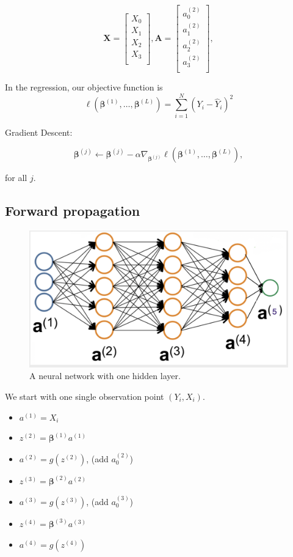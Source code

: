 \documentclass[]{book}
\providecommand{\tightlist}{%
  \setlength{\itemsep}{0pt}\setlength{\parskip}{0pt}}
\begin{document}
\[
\mathbf{X}= \begin{bmatrix}
X_0 \\ 
X_1 \\
X_2 \\ 
X_3 \\ 
\end{bmatrix},
\mathbf{A}= \begin{bmatrix}
a_0^{(2)} \\ 
a_1^{(2)} \\
a_2^{(2)} \\ 
a_3^{(2)} \\ 
\end{bmatrix},
\]

In the regression, our objective function is \[
\ell(\boldsymbol{\beta}^{(1)}, \ldots, \boldsymbol{\beta}^{(L)})= \sum_{i=1}^{N}(Y_i - \widehat{Y}_i)^2
\]

Gradient Descent:

\[
\boldsymbol{\beta}^{(j)} \leftarrow \boldsymbol{\beta}^{(j)} - \alpha \nabla_{\boldsymbol{\beta}^{(j)}} \ell(\boldsymbol{\beta}^{(1)}, \ldots, \boldsymbol{\beta}^{(L)}), 
\]

for all \(j\).

\subsection{Forward propagation}\label{forward-propagation}

\begin{figure}

{\centering \includegraphics[width=0.6\linewidth]{figures/NN_3} 

}

\caption{A neural network with one hidden layer.}\label{fig:NN3}
\end{figure}

We start with one single observation point \((Y_i, X_i)\).

\begin{itemize}
\tightlist
\item
  \(a^{(1)} = X_i\)
\item
  \(z^{(2)} = \boldsymbol{\beta}^{(1)}a^{(1)}\)
\item
  \(a^{(2)} = g(z^{(2)})\), (add \(a^{(2)}_0\))
\item
  \(z^{(3)} = \boldsymbol{\beta}^{(2)}a^{(2)}\)
\item
  \(a^{(3)} = g(z^{(3)})\), (add \(a^{(3)}_0\))
\item
  \(z^{(4)} = \boldsymbol{\beta}^{(3)}a^{(3)}\)
\item
  \(a^{(4)} = g(z^{(4)})\)
\end{itemize}
\end{document}
